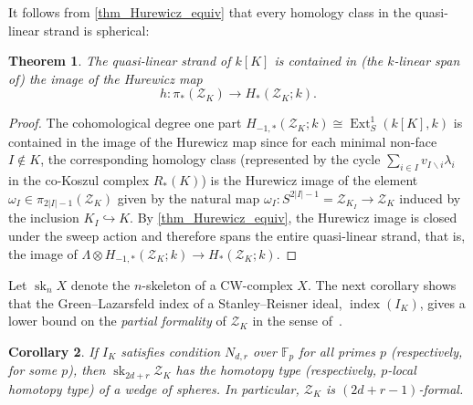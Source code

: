 \documentclass[a4paper,10pt]{amsart}
\newtheorem{theorem}{Theorem}[section]
\newtheorem{corollary}[theorem]{Corollary}
\theoremstyle{definition}
\theoremstyle{remark}
\DeclareMathOperator{\Ext}{Ext}
\begin{document}
It follows from \cref{thm_Hurewicz_equiv} that every homology class in the quasi-linear strand is spherical: 

\begin{theorem} \label{thm_Hurewicz_strand}
The quasi-linear strand of $k[K]$ is contained in (the $k$-linear span of) the image of the Hurewicz map \[ h\colon \pi_*(\mathcal{Z}_K)\longrightarrow H_*(\mathcal{Z}_K;k). \]
\end{theorem}

\begin{proof}
The cohomological degree one part $H_{-1,*}(\mathcal{Z}_K;k)\cong\Ext_S^1(k[K],k)$ is contained in the image of the Hurewicz map since for each minimal non-face $I\notin K$, the corresponding homology class (represented by the cycle $\sum_{i\in I}v_{I\smallsetminus i}\lambda_i$ in the co-Koszul complex $R_*(K)$) is the Hurewicz image of the element $\omega_I\in\pi_{2|I|-1}(\mathcal{Z}_K)$ given by the natural map $\omega_I\colon S^{2|I|-1}=\mathcal{Z}_{K_I} \to \mathcal{Z}_K$ induced by the inclusion $K_I\hookrightarrow K$. By \cref{thm_Hurewicz_equiv}, the Hurewicz image is closed under the sweep action and therefore spans the entire quasi-linear strand, that is, the image of $\Lambda\otimes H_{-1,*}(\mathcal{Z}_K;k)\to H_*(\mathcal{Z}_K;k)$.
\end{proof}

Let $\operatorname{sk}_nX$ denote the $n$-skeleton of a CW-complex $X$. The next corollary shows that the Green--Lazarsfeld index of a Stanley--Reisner ideal, $\operatorname{index}(I_K)$, gives a lower bound on the \emph{partial formality} of $\mathcal{Z}_K$ in the sense of~\cite{Ma}. 

\begin{corollary} \label{cor_Ndr}
If $I_K$ satisfies condition $N_{d,r}$ over $\mathbb{F}_p$ for all primes $p$ (respectively, for some $p$), then $\operatorname{sk}_{2d+r}\mathcal{Z}_K$ has the homotopy type (respectively, $p$-local homotopy type) of a wedge of spheres. In particular, $\mathcal{Z}_K$ is $(2d+r-1)$-formal.
\end{corollary}
\end{document}
